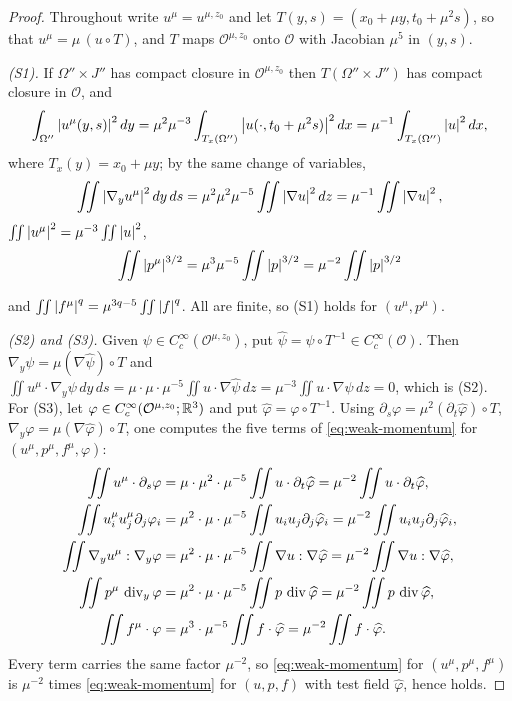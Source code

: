 \documentclass[11pt,reqno]{amsart}
\begin{document}
\begin{proof}
Throughout write $u^{\mu}=u^{\mu,z_{0}}$ and let
$T(y,s)=(x_{0}+\mu y,t_{0}+\mu^{2}s)$, so that $u^{\mu}=\mu\,(u\circ T)$, and
$T$ maps $\mathcal{O}^{\mu,z_{0}}$ onto $\mathcal{O}$ with Jacobian
$\mu^{5}$ in $(y,s)$.

\emph{(S1).} If $\Omega''\times J''$ has compact closure in
$\mathcal{O}^{\mu,z_{0}}$ then $T(\Omega''\times J'')$ has compact closure in
$\mathcal{O}$, and
\[
  \int_{\Omega''}\left\lvert u^{\mu}(y,s) \right\rvert^{2}dy
  =\mu^{2}\mu^{-3}\int_{T_{x}(\Omega'')}\left\lvert u(\cdot,t_{0}+\mu^{2}s) \right\rvert^{2}dx
  =\mu^{-1}\int_{T_{x}(\Omega'')}\left\lvert u \right\rvert^{2}dx ,
\]
where $T_{x}(y)=x_{0}+\mu y$; by the same change of variables,
\[
\iint\left\lvert \nabla_{y}u^{\mu} \right\rvert^{2}dy\,ds
 =\mu^{2}\mu^{2}\mu^{-5}\iint\left\lvert \nabla u \right\rvert^{2}dz=\mu^{-1}\iint\left\lvert \nabla u \right\rvert^{2}
,
\]
$\iint\left\lvert u^{\mu} \right\rvert^{2}=\mu^{-3}\iint\left\lvert u \right\rvert^{2}$,
\[
\iint\left\lvert p^{\mu} \right\rvert^{3/2}=\mu^{3}\mu^{-5}\iint\left\lvert p \right\rvert^{3/2}=\mu^{-2}\iint\left\lvert p \right\rvert^{3/2}
\]

and
$\iint\left\lvert f^{\mu} \right\rvert^{q}=\mu^{3q-5}\iint\left\lvert f \right\rvert^{q}$. All are finite, so (S1)
holds for $(u^{\mu},p^{\mu})$.

\emph{(S2) and (S3).} Given $\psi\in C^{\infty}_{c}(\mathcal{O}^{\mu,z_{0}})$,
put $\widehat\psi=\psi\circ T^{-1}\in C_{c}^{\infty}(\mathcal{O})$. Then
$\nabla_{y}\psi=\mu(\nabla\widehat\psi)\circ T$ and
$\iint u^{\mu}\cdot\nabla_{y}\psi\,dy\,ds
 =\mu\cdot\mu\cdot\mu^{-5}\iint u\cdot\nabla\widehat\psi\,dz
 =\mu^{-3}\iint u\cdot\nabla\widehat\psi\,dz=0$, which is (S2). For (S3), let
$\varphi\in C_{c}^{\infty}(\mathcal{O}^{\mu,z_{0}};\mathbb{R}^{3})$ and put
$\widehat\varphi=\varphi\circ T^{-1}$. Using
$\partial_{s}\varphi=\mu^{2}(\partial_{t}\widehat\varphi)\circ T$,
$\nabla_{y}\varphi=\mu(\nabla\widehat\varphi)\circ T$, one computes the five
terms of \eqref{eq:weak-momentum} for $(u^{\mu},p^{\mu},f^{\mu},\varphi)$:
\[
\begin{aligned}
  \iint u^{\mu}\cdot\partial_{s}\varphi
    &=\mu\cdot\mu^{2}\cdot\mu^{-5}\iint u\cdot\partial_{t}\widehat\varphi
     =\mu^{-2}\iint u\cdot\partial_{t}\widehat\varphi, \\
  \iint u^{\mu}_{i}u^{\mu}_{j}\partial_{j}\varphi_{i}
    &=\mu^{2}\cdot\mu\cdot\mu^{-5}\iint u_{i}u_{j}\partial_{j}\widehat\varphi_{i}
     =\mu^{-2}\iint u_{i}u_{j}\partial_{j}\widehat\varphi_{i}, \\
  \iint\nabla_{y}u^{\mu}:\nabla_{y}\varphi
    &=\mu^{2}\cdot\mu\cdot\mu^{-5}\iint\nabla u:\nabla\widehat\varphi
     =\mu^{-2}\iint\nabla u:\nabla\widehat\varphi, \\
  \iint p^{\mu}\,\operatorname{div}_{y}\varphi
    &=\mu^{2}\cdot\mu\cdot\mu^{-5}\iint p\,\operatorname{div}\widehat\varphi
     =\mu^{-2}\iint p\,\operatorname{div}\widehat\varphi, \\
  \iint f^{\mu}\cdot\varphi
    &=\mu^{3}\cdot\mu^{-5}\iint f\cdot\widehat\varphi
     =\mu^{-2}\iint f\cdot\widehat\varphi .
\end{aligned}
\]
Every term carries the same factor $\mu^{-2}$, so \eqref{eq:weak-momentum} for
$(u^{\mu},p^{\mu},f^{\mu})$ is $\mu^{-2}$ times \eqref{eq:weak-momentum} for
$(u,p,f)$ with test field $\widehat\varphi$, hence holds.


\end{proof}
\end{document}

